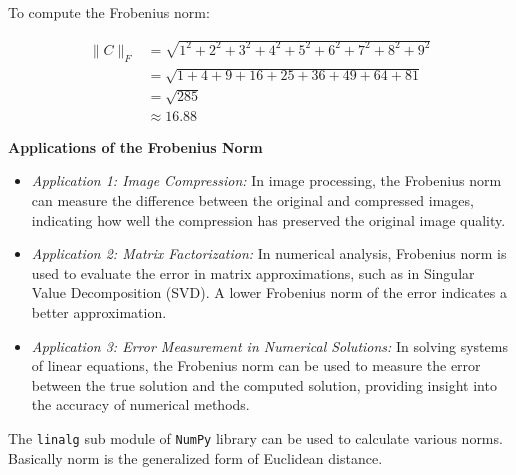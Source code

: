 \documentclass[
  letterpaper,
  DIV=11,
  numbers=noendperiod]{scrreprt}
\theoremstyle{plain}
\theoremstyle{definition}
\theoremstyle{remark}
\begin{document}
To compute the Frobenius norm:

\begin{align*}
\|C\|_F &= \sqrt{1^2 + 2^2 + 3^2 + 4^2 + 5^2 + 6^2 + 7^2 + 8^2 + 9^2}\\
&= \sqrt{1 + 4 + 9 + 16 + 25 + 36 + 49 + 64 + 81}\\
&= \sqrt{285}\\
&\approx 16.88
\end{align*}

\textbf{Applications of the Frobenius Norm}

\begin{itemize}
\item
  \emph{Application 1: Image Compression:} In image processing, the
  Frobenius norm can measure the difference between the original and
  compressed images, indicating how well the compression has preserved
  the original image quality.
\item
  \emph{Application 2: Matrix Factorization:} In numerical analysis,
  Frobenius norm is used to evaluate the error in matrix approximations,
  such as in Singular Value Decomposition (SVD). A lower Frobenius norm
  of the error indicates a better approximation.
\item
  \emph{Application 3: Error Measurement in Numerical Solutions:} In
  solving systems of linear equations, the Frobenius norm can be used to
  measure the error between the true solution and the computed solution,
  providing insight into the accuracy of numerical methods.
\end{itemize}

The \texttt{linalg} sub module of \texttt{NumPy} library can be used to
calculate various norms. Basically norm is the generalized form of
Euclidean distance.
\end{document}
